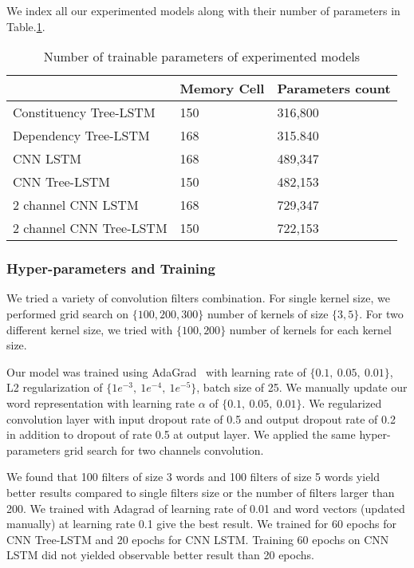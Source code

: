 We index all our experimented models along with their number of parameters in Table.\ref{table:paramtable}.
\begin{table}[H]
	\centering
	\caption{Number of trainable parameters of experimented models}
	\label{table:paramtable}
	\begin{tabular}{lll}
		~ & Memory Cell & Parameters count \\ \hline
		Constituency Tree-LSTM   & 150         & 316,800          \\
		Dependency Tree-LSTM     & 168         & 315.840          \\
		CNN LSTM                 & 168         & 489,347          \\
		CNN Tree-LSTM            & 150         & 482,153          \\
		2 channel CNN LSTM       & 168         & 729,347          \\
		2 channel CNN Tree-LSTM  & 150         & 722,153
	\end{tabular}
\end{table}
\subsubsection{Hyper-parameters and Training}
We tried a variety of convolution filters combination.
For single kernel size, we performed grid search on $\{100, 200, 300\}$ number of kernels of size $\{3, 5\}$.
For two different kernel size, we tried with $\{100, 200\}$ number of kernels for each kernel size.

Our model was trained using AdaGrad~\cite{duchi2011adaptive} with learning rate of $\{0.1,~ 0.05,~ 0.01\}$, L2 regularization of $\{1e^{-3},~ 1e^{-4}, ~ 1e^{-5} \}$, batch size of 25.
We manually update our word representation with learning rate $\alpha$ of $\{0.1,~0.05, ~0.01\}$.
We regularized convolution layer with input dropout rate of 0.5 and output dropout rate of 0.2 in addition to dropout of rate 0.5 at output layer.
We applied the same hyper-parameters grid search for two channels convolution.

We found that 100 filters of size 3 words and 100 filters of size 5 words yield better results compared to single filters size or the number of filters larger than 200. 
We trained with Adagrad of learning rate of 0.01 and word vectors (updated manually) at learning rate 0.1 give the best result. 
We trained for 60 epochs for CNN Tree-LSTM and 20 epochs for CNN LSTM. Training 60 epochs on CNN LSTM did not yielded observable better result than 20 epochs.
